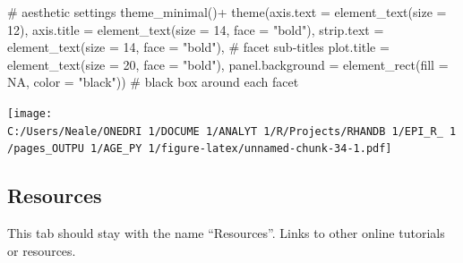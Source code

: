 \documentclass[
]{article}
\newenvironment{Shaded}{\begin{snugshade}}{\end{snugshade}}
\newcommand{\CommentTok}[1]{\textcolor[rgb]{0.50,0.62,0.50}{#1}}
\newcommand{\DataTypeTok}[1]{\textcolor[rgb]{0.87,0.87,0.75}{#1}}
\newcommand{\DecValTok}[1]{\textcolor[rgb]{0.86,0.86,0.80}{#1}}
\newcommand{\KeywordTok}[1]{\textcolor[rgb]{0.94,0.87,0.69}{#1}}
\newcommand{\NormalTok}[1]{\textcolor[rgb]{0.80,0.80,0.80}{#1}}
\newcommand{\OperatorTok}[1]{\textcolor[rgb]{0.94,0.94,0.82}{#1}}
\newcommand{\OtherTok}[1]{\textcolor[rgb]{0.94,0.94,0.56}{#1}}
\newcommand{\StringTok}[1]{\textcolor[rgb]{0.80,0.58,0.58}{#1}}
\begin{document}
\begin{Shaded}
\begin{Highlighting}[]
\StringTok{     }\CommentTok{\# aesthetic settings}
\StringTok{     }\KeywordTok{theme\_minimal}\NormalTok{()}\OperatorTok{+}
\StringTok{     }\KeywordTok{theme}\NormalTok{(}\DataTypeTok{axis.text =} \KeywordTok{element\_text}\NormalTok{(}\DataTypeTok{size =} \DecValTok{12}\NormalTok{),}
           \DataTypeTok{axis.title =} \KeywordTok{element\_text}\NormalTok{(}\DataTypeTok{size =} \DecValTok{14}\NormalTok{, }\DataTypeTok{face =} \StringTok{"bold"}\NormalTok{),}
           \DataTypeTok{strip.text =} \KeywordTok{element\_text}\NormalTok{(}\DataTypeTok{size =} \DecValTok{14}\NormalTok{, }\DataTypeTok{face =} \StringTok{"bold"}\NormalTok{),  }\CommentTok{\# facet sub{-}titles}
           \DataTypeTok{plot.title =} \KeywordTok{element\_text}\NormalTok{(}\DataTypeTok{size =} \DecValTok{20}\NormalTok{, }\DataTypeTok{face =} \StringTok{"bold"}\NormalTok{),}
           \DataTypeTok{panel.background =} \KeywordTok{element\_rect}\NormalTok{(}\DataTypeTok{fill =} \OtherTok{NA}\NormalTok{, }\DataTypeTok{color =} \StringTok{"black"}\NormalTok{)) }\CommentTok{\# black box around each facet}
\end{Highlighting}
\end{Shaded}

\texttt{[image: C:/Users/Neale/ONEDRI~1/DOCUME~1/ANALYT~1/R/Projects/RHANDB~1/EPI\_R\_~1/pages\_OUTPU~1/AGE\_PY~1/figure-latex/unnamed-chunk-34-1.pdf]}

\hypertarget{resources}{%
\subsection{Resources}\label{resources}}

This tab should stay with the name ``Resources''. Links to other online
tutorials or resources.
\end{document}
